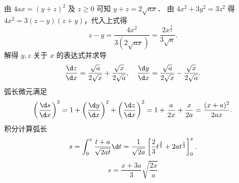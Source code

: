 \begin{solution}
    由 $4ax = (y+z)^2$ 及 $z \ge 0$ 可知 $y+z = 2\sqrt{ax}$．
    由 $4x^2 + 3y^2 = 3z^2$ 得 $4x^2 = 3(z-y)(z+y)$，代入上式得
    \begin{equation}
        z-y = \frac{4x^2}{3(2\sqrt{ax})} = \frac{2x^{\frac{3}{2}}}{3\sqrt{a}}.
    \end{equation}
    解得 $y, z$ 关于 $x$ 的表达式并求导
    \begin{equation}
        \frac{\d z}{\d x} = \frac{\sqrt{a}}{2\sqrt{x}} + \frac{\sqrt{x}}{2\sqrt{a}}, \quad \frac{\d y}{\d x} = \frac{\sqrt{a}}{2\sqrt{x}} - \frac{\sqrt{x}}{2\sqrt{a}}.
    \end{equation}
    弧长微元满足
    \begin{equation}
        \left( \frac{\d s}{\d x} \right)^2 = 1 + \left( \frac{\d y}{\d x} \right)^2 + \left( \frac{\d z}{\d x} \right)^2 = 1 + \frac{a}{2x} + \frac{x}{2a} = \frac{(x+a)^2}{2ax}.
    \end{equation}
    积分计算弧长
    \begin{equation}
        s = \int_{0}^{x} \frac{t+a}{\sqrt{2at}} \d t = \frac{1}{\sqrt{2a}} \left[ \frac{2}{3}t^{\frac{3}{2}} + 2at^{\frac{1}{2}} \right]_0^x.
    \end{equation}
    \begin{equation}
        \boxed{s = \frac{x+3a}{3}\sqrt{\frac{2x}{a}}}
    \end{equation}
\end{solution}

